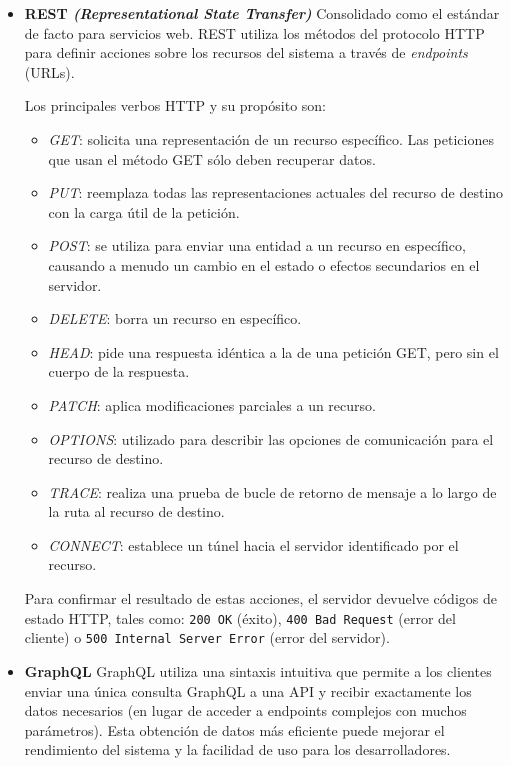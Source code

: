 \begin{itemize}
    \item \textbf{REST \textit{(Representational State Transfer)}}
    \newline
    Consolidado como el estándar de facto para servicios web. REST utiliza los métodos del protocolo HTTP para definir acciones sobre 
    los recursos del sistema a través de \textit{endpoints} (URLs).

    Los principales verbos HTTP y su propósito son: \cite{metodosHttp}

    \begin{itemize}
        \item \textit{GET}: solicita una representación de un recurso específico. Las peticiones que usan el método GET 
        sólo deben recuperar datos. 
        \item \textit{PUT}: reemplaza todas las representaciones actuales del recurso de destino con la carga útil de 
        la petición.
        \item \textit{POST}: se utiliza para enviar una entidad a un recurso en específico, causando a menudo un cambio 
        en el estado o efectos secundarios en el servidor.
        \item \textit{DELETE}: borra un recurso en específico.
        \item \textit{HEAD}: pide una respuesta idéntica a la de una petición GET, pero sin el cuerpo de la respuesta.
        \item \textit{PATCH}: aplica modificaciones parciales a un recurso.
        \item \textit{OPTIONS}: utilizado para describir las opciones de comunicación para el recurso de destino.
        \item \textit{TRACE}: realiza una prueba de bucle de retorno de mensaje a lo largo de la ruta al recurso de destino.
        \item \textit{CONNECT}: establece un túnel hacia el servidor identificado por el recurso.
    \end{itemize}

    Para confirmar el resultado de estas acciones, el servidor devuelve códigos de estado HTTP, tales como: \texttt{200 OK} (éxito), 
    \texttt{400 Bad Request} (error del cliente) o \texttt{500 Internal Server Error} (error del servidor).

    \item \textbf{GraphQL} \cite{graphql}
    \newline
    GraphQL utiliza una sintaxis intuitiva que permite a los clientes enviar una única consulta GraphQL a una API y 
    recibir exactamente los datos necesarios (en lugar de acceder a endpoints complejos con muchos parámetros). 
    Esta obtención de datos más eficiente puede mejorar el rendimiento del sistema y la facilidad de uso para los 
    desarrolladores. 


\end{itemize}
